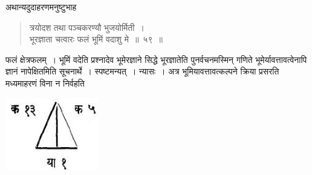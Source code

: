\documentclass[11pt, openany]{book}
\begin{document}
\vspace{-3mm}
 अथान्यदुदाहरणमनुष्टुभाह\textendash
\begin{quote}
    \ex
    त्रयोदश तथा पञ्चकरण्यौ भुजयोर्मिती~। \\
 भूरज्ञाता चत्वारः फलं भूमिं वदाशु मे~॥~५९~॥
\end{quote}
 
\newpage %

\begin{flushleft}
\begin{minipage}[c]{0.7\textwidth}
\hspace{4mm} फलं क्षेत्रफलम्~। भूमिं वदेति प्रश्नादेव भूमेरज्ञाने सिद्धे भूरज्ञातेति 
पुनर्वचनमस्मिन् गणिते भूमेर्यावत्तावत्वेनापि ज्ञानं नापेक्षितमिति सूचनार्थे~। 
स्पष्टमन्यत्~। न्यासः~। अत्र भूमियावत्तावत्कल्पने क्रिया प्रसरति मध्यमाहरणं विना न निर्वहति
\end{minipage} 
\hfill
\begin{minipage}{0.25\textwidth} 
\includegraphics[scale=0.7]{Graphics/Capture18.JPG}
\end{minipage} 
\end{flushleft}
\vspace{-2mm}
\end{document}
